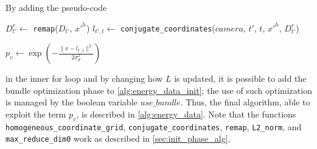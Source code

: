 \documentclass[notitlepage,english]{hgbreport}
\begin{document}
By adding the pseudo-code
	\begin{algorithmic}[0]
		\State $D^r_{t'} \leftarrow$ \texttt{remap}($D_{t'}$, $x'^h$)
		\State $l_{t',t}\leftarrow$ \texttt{conjugate\_coordinates}($camera$, $t'$,  $t$, $x'^h$, $D^r_{t'}$)

		\State $p_v \leftarrow \exp\left(-\frac{\lVert x - l_{t',t}\rVert^2}{2\sigma_d^2}\right)$
	\end{algorithmic}
in the inner for loop and by changing how $L$ is updated, it is possible to add the bundle optimization phase  to \cref{alg:energy_data_init}; the use of such optimization is managed by the boolean variable $use\_bundle$.
Thus, the final algorithm, able to exploit the term $p_v$, is described in \cref{alg:energy_data}. Note that the functions \texttt{homogeneous\_coordinate\_grid}, \texttt{conjugate\_coordinates}, \texttt{remap},  \texttt{L2\_norm}, and  \texttt{max\_reduce\_dim0} work as described in \cref{sec:init_phase_alg}.
\end{document}
